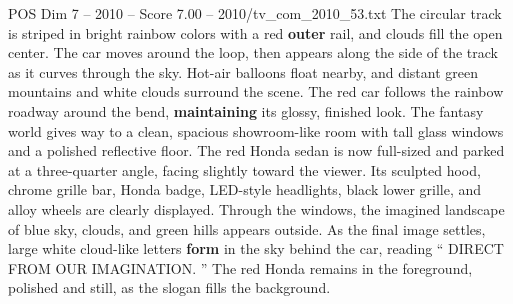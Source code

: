 \begin{textsample}{POS Dim 7 – 2010 – Score 7.00 – 2010/tv\_com\_2010\_53.txt}
The circular track is striped in bright rainbow colors with a red \textbf{outer} rail, and clouds fill the open center.
The car moves around the loop, then appears along the side of the track as it curves through the sky.
Hot-air balloons float nearby, and distant green mountains and white clouds surround the scene.
The red car follows the rainbow roadway around the bend, \textbf{maintaining} its glossy, finished look.
The fantasy world gives way to a clean, spacious showroom-like room with tall glass windows and a polished reflective floor.
The red Honda sedan is now full-sized and parked at a three-quarter angle, facing slightly toward the viewer.
Its sculpted hood, chrome grille bar, Honda badge, LED-style headlights, black lower grille, and alloy wheels are clearly displayed.
Through the windows, the imagined landscape of blue sky, clouds, and green hills appears outside.
As the final image settles, large white cloud-like letters \textbf{form} in the sky behind the car, reading “ DIRECT FROM OUR IMAGINATION. ” The red Honda remains in the foreground, polished and still, as the slogan fills the background.

\end{textsample}
